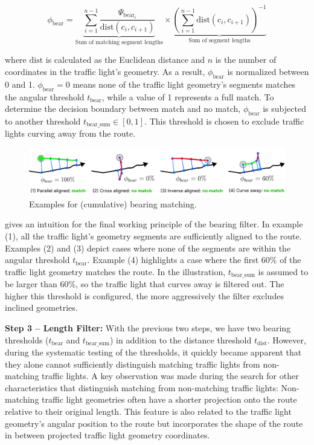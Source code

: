 \begin{equation} 
\phi_{\text{bear}} = 
    \underbrace{\sum_{i=1}^{n-1} 
    \frac{\Psi_{\text{bear}_i}}{\text{dist}(c_i, c_{i+1})}}_{\text{Sum of matching segment lengths}}
    \times
    \underbrace{(\sum_{i=1}^{n-1} \text{dist}(c_i, c_{i+1}))^{-1}}_{\text{Sum of segment lengths}}
\end{equation}

where $\text{dist}$ is calculated as the Euclidean distance and $n$ is the number of coordinates in the traffic light's geometry. As a result, $\phi_{\text{bear}}$ is normalized between 0 and 1. $\phi_{\text{bear}} = 0$ means none of the traffic light geometry's segments matches the angular threshold $t_{\text{bear}}$, while a value of 1 represents a full match. To determine the decision boundary between match and no match, $\phi_{\text{bear}}$ is subjected to another threshold $t_{\text{bear\_sum}} \in [0, 1]$. This threshold is chosen to exclude traffic lights curving away from the route.

\begin{figure}[b]
\centering
\includegraphics[width=\linewidth]{images/sg-selection-bearing-filter-sum.pdf}
\caption{Examples for (cumulative) bearing matching.}
\label{fig:sg-selection-bearing-filter-sum}
\end{figure}

 gives an intuition for the final working principle of the bearing filter. In example (1), all the traffic light's geometry segments are sufficiently aligned to the route. Examples (2) and (3) depict cases where none of the segments are within the angular threshold $t_{\text{bear}}$. Example (4) highlights a case where the first 60\% of the traffic light geometry matches the route. In the illustration, $t_{\text{bear\_sum}}$ is assumed to be larger than 60\%, so the traffic light that curves away is filtered out. The higher this threshold is configured, the more aggressively the filter excludes inclined geometries.

\textbf{\color{cidarkblue}Step 3 -- Length Filter:} With the previous two steps, we have two bearing thresholds ($t_{\text{bear}}$ and $t_{\text{bear\_sum}}$) in addition to the distance threshold $t_{\text{dist}}$. However, during the systematic testing of the thresholds, it quickly became apparent that they alone cannot sufficiently distinguish matching traffic lights from non-matching traffic lights. A key observation was made during the search for other characteristics that distinguish matching from non-matching traffic lights: Non-matching traffic light geometries often have a shorter projection onto the route relative to their original length. This feature is also related to the traffic light geometry's angular position to the route but incorporates the shape of the route in between projected traffic light geometry coordinates.

